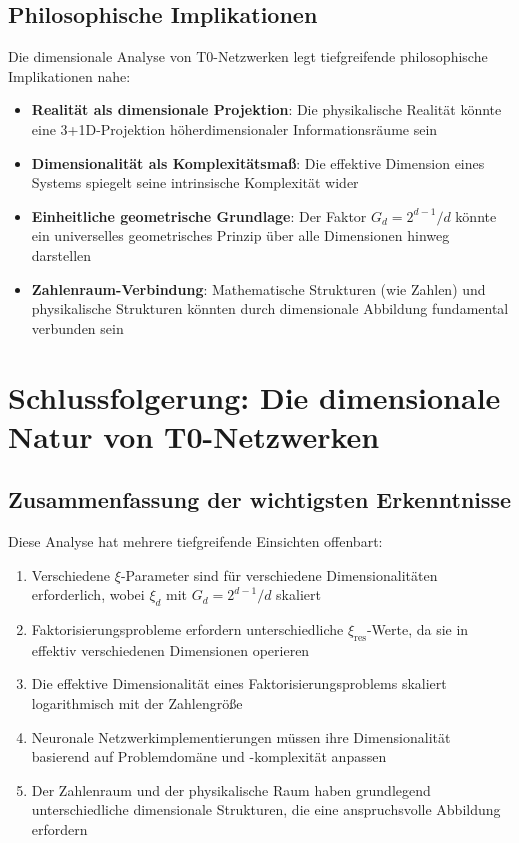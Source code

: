 \documentclass[12pt,a4paper]{article}
\newcommand{\xipar}{\ensuremath{\xi}}
\begin{document}
	\subsection{Philosophische Implikationen}
	\label{subsec:philosophical_implications}
	
	Die dimensionale Analyse von T0-Netzwerken legt tiefgreifende philosophische Implikationen nahe:
	
	\begin{itemize}
		\item \textbf{Realität als dimensionale Projektion}: Die physikalische Realität könnte eine 3+1D-Projektion höherdimensionaler Informationsräume sein
		\item \textbf{Dimensionalität als Komplexitätsmaß}: Die effektive Dimension eines Systems spiegelt seine intrinsische Komplexität wider
		\item \textbf{Einheitliche geometrische Grundlage}: Der Faktor $G_d = 2^{d-1}/d$ könnte ein universelles geometrisches Prinzip über alle Dimensionen hinweg darstellen
		\item \textbf{Zahlenraum-Verbindung}: Mathematische Strukturen (wie Zahlen) und physikalische Strukturen könnten durch dimensionale Abbildung fundamental verbunden sein
	\end{itemize}
	
	\section{Schlussfolgerung: Die dimensionale Natur von T0-Netzwerken}
	\label{sec:conclusion}
	
	\subsection{Zusammenfassung der wichtigsten Erkenntnisse}
	\label{subsec:key_findings}
	
	Diese Analyse hat mehrere tiefgreifende Einsichten offenbart:
	
	\begin{enumerate}
		\item Verschiedene $\xipar$-Parameter sind für verschiedene Dimensionalitäten erforderlich, wobei $\xipar_d$ mit $G_d = 2^{d-1}/d$ skaliert
		\item Faktorisierungsprobleme erfordern unterschiedliche $\xipar_{\text{res}}$-Werte, da sie in effektiv verschiedenen Dimensionen operieren
		\item Die effektive Dimensionalität eines Faktorisierungsproblems skaliert logarithmisch mit der Zahlengröße
		\item Neuronale Netzwerkimplementierungen müssen ihre Dimensionalität basierend auf Problemdomäne und -komplexität anpassen
		\item Der Zahlenraum und der physikalische Raum haben grundlegend unterschiedliche dimensionale Strukturen, die eine anspruchsvolle Abbildung erfordern
	\end{enumerate}
	
\end{document}
